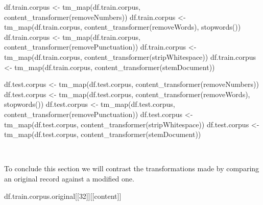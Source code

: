 \documentclass[
]{article}
\newenvironment{Shaded}{\begin{snugshade}}{\end{snugshade}}
\newcommand{\FunctionTok}[1]{\textcolor[rgb]{0.00,0.00,0.00}{#1}}
\newcommand{\NormalTok}[1]{#1}
\newcommand{\OtherTok}[1]{\textcolor[rgb]{0.56,0.35,0.01}{#1}}
\newcommand{\StringTok}[1]{\textcolor[rgb]{0.31,0.60,0.02}{#1}}
\begin{document}
\begin{Shaded}
\begin{Highlighting}[]
\NormalTok{df.train.corpus }\OtherTok{\textless{}{-}} \FunctionTok{tm\_map}\NormalTok{(df.train.corpus, }\FunctionTok{content\_transformer}\NormalTok{(removeNumbers))}
\NormalTok{df.train.corpus }\OtherTok{\textless{}{-}} \FunctionTok{tm\_map}\NormalTok{(df.train.corpus, }\FunctionTok{content\_transformer}\NormalTok{(removeWords), }\FunctionTok{stopwords}\NormalTok{())}
\NormalTok{df.train.corpus }\OtherTok{\textless{}{-}} \FunctionTok{tm\_map}\NormalTok{(df.train.corpus, }\FunctionTok{content\_transformer}\NormalTok{(removePunctuation))}
\NormalTok{df.train.corpus }\OtherTok{\textless{}{-}} \FunctionTok{tm\_map}\NormalTok{(df.train.corpus, }\FunctionTok{content\_transformer}\NormalTok{(stripWhitespace))}
\NormalTok{df.train.corpus }\OtherTok{\textless{}{-}} \FunctionTok{tm\_map}\NormalTok{(df.train.corpus, }\FunctionTok{content\_transformer}\NormalTok{(stemDocument))}

\NormalTok{df.test.corpus }\OtherTok{\textless{}{-}} \FunctionTok{tm\_map}\NormalTok{(df.test.corpus, }\FunctionTok{content\_transformer}\NormalTok{(removeNumbers))}
\NormalTok{df.test.corpus }\OtherTok{\textless{}{-}} \FunctionTok{tm\_map}\NormalTok{(df.test.corpus, }\FunctionTok{content\_transformer}\NormalTok{(removeWords), }\FunctionTok{stopwords}\NormalTok{())}
\NormalTok{df.test.corpus }\OtherTok{\textless{}{-}} \FunctionTok{tm\_map}\NormalTok{(df.test.corpus, }\FunctionTok{content\_transformer}\NormalTok{(removePunctuation))}
\NormalTok{df.test.corpus }\OtherTok{\textless{}{-}} \FunctionTok{tm\_map}\NormalTok{(df.test.corpus, }\FunctionTok{content\_transformer}\NormalTok{(stripWhitespace))}
\NormalTok{df.test.corpus }\OtherTok{\textless{}{-}} \FunctionTok{tm\_map}\NormalTok{(df.test.corpus, }\FunctionTok{content\_transformer}\NormalTok{(stemDocument))}
\end{Highlighting}
\end{Shaded}

~

To conclude this section we will contrast the transformations made by
comparing an original record against a modified one.

\begin{Shaded}
\begin{Highlighting}[]
\NormalTok{df.train.corpus.original[[}\StringTok{\textquotesingle{}32\textquotesingle{}}\NormalTok{]][[}\StringTok{\textquotesingle{}content\textquotesingle{}}\NormalTok{]]}
\end{Highlighting}
\end{Shaded}
\end{document}
